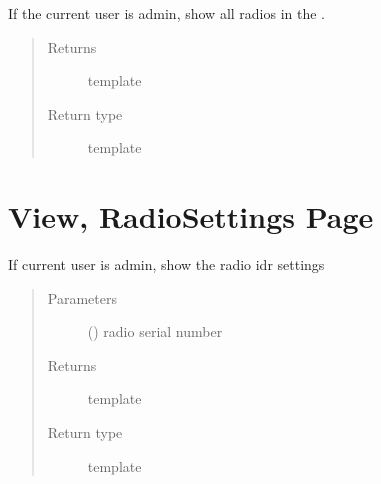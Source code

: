 \documentclass[letterpaper,10pt,english]{sphinxmanual}
\begin{document}
\begin{fulllineitems}
\label{\detokenize{index:view.radios.radios}}
If the current user is admin, show all radios in the .
\begin{quote}\begin{description}
\item[{Returns}] \leavevmode
template 

\item[{Return type}] \leavevmode
template

\end{description}\end{quote}

\end{fulllineitems}



\chapter{View, RadioSettings Page}
\label{\detokenize{index:module-view.radio_settings}}\label{\detokenize{index:view-radiosettings-page}}

\begin{fulllineitems}
\label{\detokenize{index:view.radio_settings.radio_settings}}
If current user is admin, show the radio idr settings
\begin{quote}\begin{description}
\item[{Parameters}] \leavevmode
{} () \textendash{} radio serial number

\item[{Returns}] \leavevmode
template 

\item[{Return type}] \leavevmode
template

\end{description}\end{quote}

\end{fulllineitems}
\end{document}

